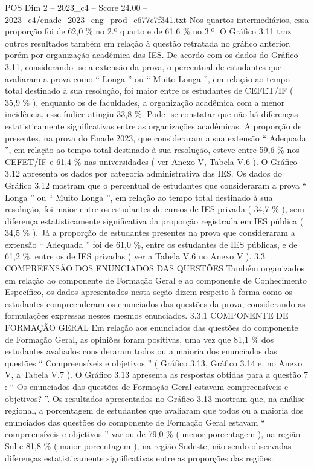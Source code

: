 \begin{textsample}{POS Dim 2 – 2023\_c4 – Score 24.00 – 2023\_c4/enade\_2023\_eng\_prod\_c677c7f341.txt}
Nos quartos intermediários, essa proporção foi de 62,0 \% no 2.º quarto e de 61,6 \% no 3.º.
O Gráfico 3.11 traz outros resultados também em relação à questão retratada no gráfico anterior, porém por organização acadêmica das IES.
De acordo com os dados do Gráfico 3.11, considerando -se a extensão da prova, o percentual de estudantes que avaliaram a prova como “ Longa ” ou “ Muito Longa ”, em relação ao tempo total destinado à sua resolução, foi maior entre os estudantes de CEFET/IF ( 35,9 \% ), enquanto os de faculdades, a organização acadêmica com a menor incidência, esse índice atingiu 33,8 \%.
Pode -se constatar que não há diferenças estatisticamente significativas entre as organizações acadêmicas.
A proporção de presentes, na prova do Enade 2023, que consideraram a sua extensão “ Adequada ”, em relação ao tempo total destinado à sua resolução, esteve entre 59,6 \% nos CEFET/IF e 61,4 \% nas universidades ( ver Anexo V, Tabela V.6 ).
O Gráfico 3.12 apresenta os dados por categoria administrativa das IES.
Os dados do Gráfico 3.12 mostram que o percentual de estudantes que consideraram a prova “ Longa ” ou “ Muito Longa ”, em relação ao tempo total destinado à sua resolução, foi maior entre os estudantes de cursos de IES privada ( 34,7 \% ), sem diferença estatisticamente significativa da proporção registrada em IES pública ( 34,5 \% ).
Já a proporção de estudantes presentes na prova que consideraram a extensão “ Adequada ” foi de 61,0 \%, entre os estudantes de IES públicas, e de 61,2 \%, entre os de IES privadas ( ver a Tabela V.6 no Anexo V ). 3.3 COMPREENSÃO DOS ENUNCIADOS DAS QUESTÕES Também organizados em relação ao componente de Formação Geral e ao componente de Conhecimento Específico, os dados apresentados nesta seção dizem respeito à forma como os estudantes compreenderam os enunciados das questões da prova, considerando as formulações expressas nesses mesmos enunciados. 3.3.1 COMPONENTE DE FORMAÇÃO GERAL Em relação aos enunciados das questões do componente de Formação Geral, as opiniões foram positivas, uma vez que 81,1 \% dos estudantes avaliados consideraram todos ou a maioria dos enunciados das questões “ Compreensíveis e objetivos ” ( Gráfico 3.13, Gráfico 3.14 e, no Anexo V, a Tabela V.7 ).
O Gráfico 3.13 apresenta as respostas obtidas para a questão 7 : “ Os enunciados das questões de Formação Geral estavam compreensíveis e objetivos? ”.
Os resultados apresentados no Gráfico 3.13 mostram que, na análise regional, a porcentagem de estudantes que avaliaram que todos ou a maioria dos enunciados das questões do componente de Formação Geral estavam “ compreensíveis e objetivos ” variou de 79,0 \% ( menor porcentagem ), na região Sul e 81,8 \% ( maior porcentagem ), na região Sudeste, não sendo observadas diferenças estatisticamente significativas entre as proporções das regiões.

\end{textsample}
